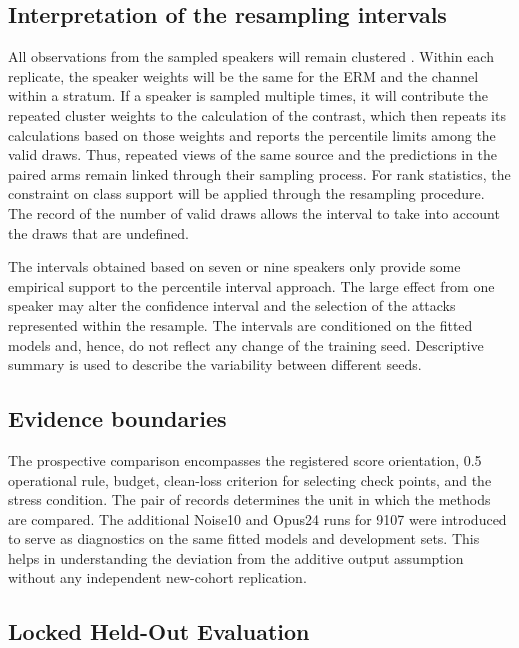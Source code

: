 \subsection{Interpretation of the resampling intervals}

All observations from the sampled speakers will remain clustered \cite{field}. Within each replicate, the speaker weights will be the same for the ERM and the channel within a stratum. If a speaker is sampled multiple times, it will contribute the repeated cluster weights to the calculation of the contrast, which then repeats its calculations based on those weights and reports the percentile limits among the valid draws. Thus, repeated views of the same source and the predictions in the paired arms remain linked through their sampling process. For rank statistics, the constraint on class support will be applied through the resampling procedure. The record of the number of valid draws allows the interval to take into account the draws that are undefined.

The intervals obtained based on seven or nine speakers only provide some empirical support to the percentile interval approach. The large effect from one speaker may alter the confidence interval and the selection of the attacks represented within the resample. The intervals are conditioned on the fitted models and, hence, do not reflect any change of the training seed. Descriptive summary is used to describe the variability between different seeds.

\subsection{Evidence boundaries}

The prospective comparison encompasses the registered score orientation, 0.5 operational rule, budget, clean-loss criterion for selecting check points, and the stress condition. The pair of records determines the unit in which the methods are compared. The additional Noise10 and Opus24 runs for 9107 were introduced to serve as diagnostics on the same fitted models and development sets. This helps in understanding the deviation from the additive output assumption without any independent new-cohort replication.

\subsection{Locked Held-Out Evaluation}\label{sec:heldout-design}

